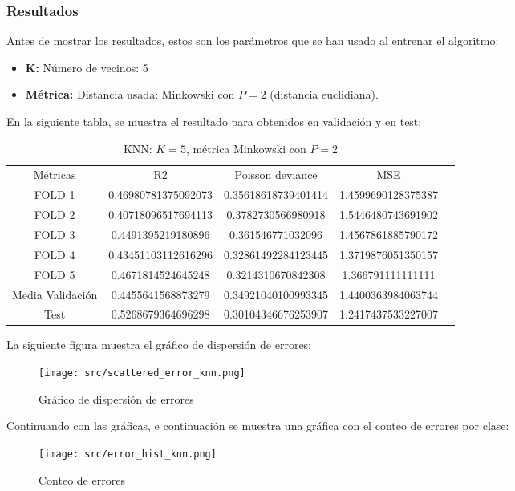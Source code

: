 \subsubsection{Resultados}
Antes de mostrar los resultados, estos son los parámetros que se han usado al entrenar el algoritmo:
\begin{itemize}
	\item \textbf{K:} Número de vecinos: 5
	\item \textbf{Métrica:} Distancia usada: Minkowski con $P=2$ (distancia euclidiana).
\end{itemize}
En la siguiente tabla, se muestra el resultado para obtenidos en validación y en test:
\linebreak
\begin{table}[H]
	\begin{tabular}{|c|c|c|c|c}
		\cline{1-4}
		Métricas         & R2                  & Poisson deviance    & MSE                \\ \cline{1-4}
		FOLD 1           & 0.46980781375092073 & 0.35618618739401414 & 1.4599690128375387 \\ \cline{1-4}
		FOLD 2           & 0.40718096517694113 & 0.3782730566980918  & 1.5446480743691902 \\ \cline{1-4}
		FOLD 3           & 0.4491395219180896  & 0.361546771032096   & 1.4567861885790172 \\ \cline{1-4}
		FOLD 4           & 0.43451103112616296 & 0.32861492284123445 & 1.3719876051350157 \\ \cline{1-4}
		FOLD 5           & 0.4671814524645248  & 0.3214310670842308  & 1.366791111111111  \\ \cline{1-4}
		Media Validación & 0.4455641568873279  & 0.34921040100993345 & 1.4400363984063744 \\ \cline{1-4}
		Test             & 0.5268679364696298  & 0.30104346676253907 & 1.2417437533227007 \\ \cline{1-4}
	\end{tabular}
	\caption{KNN: $K=5$, métrica Minkowski con $P=2$}
	\label{tab:knn_res}
\end{table}
La siguiente figura muestra el gráfico de dispersión de errores:
\begin{figure}[H]
	\centering
	\texttt{[image: src/scattered\_error\_knn.png]}
	\caption{Gráfico de dispersión de errores}
	\label{fig:knn_scattered}
\end{figure}
Continuando con las gráficas, e continuación se muestra una gráfica con el conteo de errores por clase:\\
\linebreak
\begin{figure}[H]
	\centering
	\texttt{[image: src/error\_hist\_knn.png]}
	\caption{Conteo de errores}
	\label{fig:knn_error_plot}
\end{figure}
